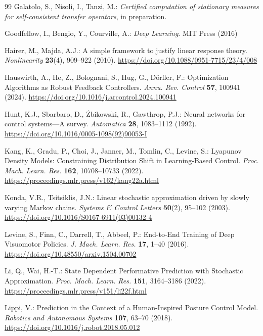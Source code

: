 \documentclass[11pt]{article}
\theoremstyle{definition}
\theoremstyle{remark}
\begin{document}
{\begin{thebibliography}{99}
Galatolo, S., Nisoli, I., Tanzi, M.:
\emph{Certified computation of stationary measures for self-consistent
transfer operators}, in preparation.

Goodfellow, I., Bengio, Y., Courville, A.: \emph{Deep Learning}. MIT Press (2016)

Hairer, M., Majda, A.J.:
A simple framework to justify linear response theory.
\emph{Nonlinearity}
\textbf{23}(4), 909--922 (2010).
\url{https://doi.org/10.1088/0951-7715/23/4/008}

Hauswirth, A., He, Z., Bolognani, S., Hug, G., D\"orfler, F.: Optimization Algorithms as Robust Feedback Controllers. \emph{Annu. Rev. Control} \textbf{57}, 100941 (2024). \url{https://doi.org/10.1016/j.arcontrol.2024.100941}

Hunt, K.J., Sbarbaro, D., \.Zbikowski, R., Gawthrop, P.J.: Neural networks for control systems---A survey. \emph{Automatica} \textbf{28}, 1083--1112 (1992). \url{https://doi.org/10.1016/0005-1098(92)90053-I}

Kang, K., Gradu, P., Choi, J., Janner, M., Tomlin, C., Levine, S.: Lyapunov Density Models: Constraining Distribution Shift in Learning-Based Control. \emph{Proc. Mach. Learn. Res.} \textbf{162}, 10708--10733 (2022). \url{https://proceedings.mlr.press/v162/kang22a.html}

Konda, V.R., Tsitsiklis, J.N.:
Linear stochastic approximation driven by slowly varying
Markov chains.
\emph{Systems \& Control Letters}
\textbf{50}(2), 95--102 (2003).
\url{https://doi.org/10.1016/S0167-6911(03)00132-4}

Levine, S., Finn, C., Darrell, T., Abbeel, P.: End-to-End Training of Deep Visuomotor Policies. \emph{J. Mach. Learn. Res.} \textbf{17}, 1--40 (2016). \url{https://doi.org/10.48550/arxiv.1504.00702}

Li, Q., Wai, H.-T.: State Dependent Performative Prediction with Stochastic Approximation. \emph{Proc. Mach. Learn. Res.} \textbf{151}, 3164--3186 (2022). \url{https://proceedings.mlr.press/v151/li22f.html}

Lippi, V.: Prediction in the Context of a Human-Inspired Posture Control Model. \emph{Robotics and Autonomous Systems} \textbf{107}, 63--70 (2018). \url{https://doi.org/10.1016/j.robot.2018.05.012}


\end{thebibliography}}
\end{document}
